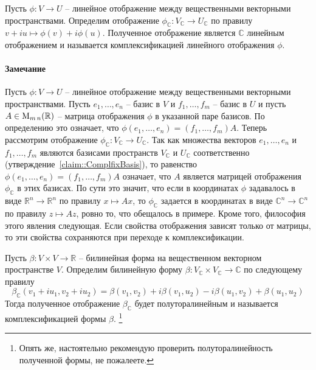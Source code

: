 \begin{definition}
Пусть $\phi\colon V\to U$ -- линейное отображение между вещественными векторными пространствами.
Определим отображение $\phi_\mathbb C\colon V_\mathbb C\to U_\mathbb C$ по правилу $v+iu \mapsto \phi(v) + i\phi(u)$.
Полученное отображение является $\mathbb C$ линейным отображением и называется комплексификацией линейного отображения $\phi$.
\end{definition}

\paragraph{Замечание}

Пусть $\phi\colon V\to U$ -- линейное  отображение между вещественными векторными пространствами.
Пусть $e_1,\ldots,e_n$ -- базис в $V$ и $f_1,\ldots,f_m$ -- базис в $U$ и пусть $A\in \operatorname{M}_{m\,n}(\mathbb R)$ -- матрица отображения $\phi$ в указанной паре базисов.
По определению это означает, что $\phi(e_1,\ldots,e_n) = (f_1,\ldots,f_m)A$.
Теперь рассмотрим отображение $\phi_\mathbb C \colon V_\mathbb C\to U_\mathbb C$.
Так как множества векторов $e_1,\ldots,e_n$ и $f_1,\ldots,f_m$ являются базисами пространств $V_\mathbb C$ и $U_\mathbb C$ соответственно (утверждение~\ref{claim::ComplfixBasis}), то равенство $\phi(e_1,\ldots,e_n) = (f_1,\ldots,f_m)A$ означает, что $A$ является матрицей отображения $\phi_\mathbb C$ в этих базисах.
По сути это значит, что если в координатах $\phi$ задавалось в виде $\mathbb R^n \to \mathbb R^n$ по правилу $x \mapsto Ax$, то $\phi_\mathbb C$ задается в координатах в виде $\mathbb C^n \to \mathbb C^n$ по правилу $z\mapsto Az$, ровно то, что обещалось в примере.
Кроме того, философия этого явления следующая.
Если свойства отображения зависят только от матрицы, то эти свойства сохраняются при переходе к комплексификации.


\begin{definition}
\label{definition::ComplfixBil}
Пусть $\beta\colon V\times V\to \mathbb R$ -- билинейная форма на вещественном векторном пространстве $V$.
Определим билинейную форму $\beta \colon V_\mathbb C\times V_\mathbb C\to \mathbb C$ по следующему правилу
\[
\beta_\mathbb C(v_1+iu_1, v_2 + iu_2) = \beta(v_1, v_2) + i\beta(v_1,u_2) - i\beta(u_1, v_2) + \beta(u_1, u_2)
\]
Тогда полученное отображение $\beta_\mathbb C$ будет полуторалинейным и называется комплексификацией формы $\beta$.%
\footnote{Опять же, настоятельно рекомендую проверить полуторалинейность полученной формы, не пожалеете.}
\end{definition}

